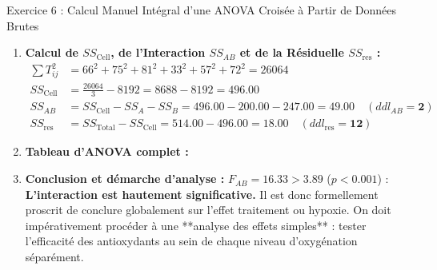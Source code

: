 \documentclass[11pt,a4paper]{article}
\begin{document}
\begin{solutionbox}{Exercice 6 : Calcul Manuel Intégral d'une ANOVA Croisée à Partir de Données Brutes}
\begin{enumerate}[label=\textbf{\alph*.}]
  \item \textbf{Calcul de $SS_{\text{Cell}}$, de l'Interaction $SS_{AB}$ et de la Résiduelle $SS_{\text{res}}$ :}
  \begin{align*}
    \sum T_{ij}^2 &= 66^2 + 75^2 + 81^2 + 33^2 + 57^2 + 72^2 = 26064 \\
    SS_{\text{Cell}} &= \frac{26064}{3} - 8192 = 8688 - 8192 = \mathbf{496.00} \\
    SS_{AB} &= SS_{\text{Cell}} - SS_A - SS_B = 496.00 - 200.00 - 247.00 = \mathbf{49.00} \quad (ddl_{AB} = \mathbf{2}) \\
    SS_{\text{res}} &= SS_{\text{Total}} - SS_{\text{Cell}} = 514.00 - 496.00 = \mathbf{18.00} \quad (ddl_{\text{res}} = \mathbf{12})
  \end{align*}

  \item \textbf{Tableau d'ANOVA complet :}
  \begin{center}
  \end{center}

  \item \textbf{Conclusion et démarche d'analyse :}
  $F_{AB} = 16.33 > 3.89$ ($p < 0.001$) : \textbf{L'interaction est hautement significative.}
  Il est donc formellement proscrit de conclure globalement sur l'effet traitement ou hypoxie. On doit impérativement procéder à une **analyse des effets simples** : tester l'efficacité des antioxydants au sein de chaque niveau d'oxygénation séparément.
\end{enumerate}
\end{solutionbox}
\end{document}
